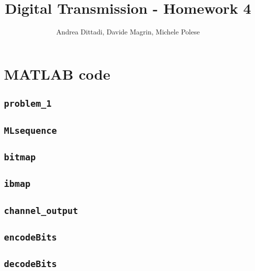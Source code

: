 \documentclass[10pt]{article}
\numberwithin{equation}{section}
\begin{document}
\title{Digital Transmission - Homework 4}
\author{Andrea Dittadi, Davide Magrin, Michele Polese}

\maketitle


\section*{MATLAB code}

\subsection*{\texttt{problem\_1}}



\subsection*{\texttt{MLsequence}}


\subsection*{\texttt{bitmap}}


\pagebreak

\subsection*{\texttt{ibmap}}


\subsection*{\texttt{channel\_output}}


\pagebreak

\subsection*{\texttt{encodeBits}}


\subsection*{\texttt{decodeBits}}

\end{document}
